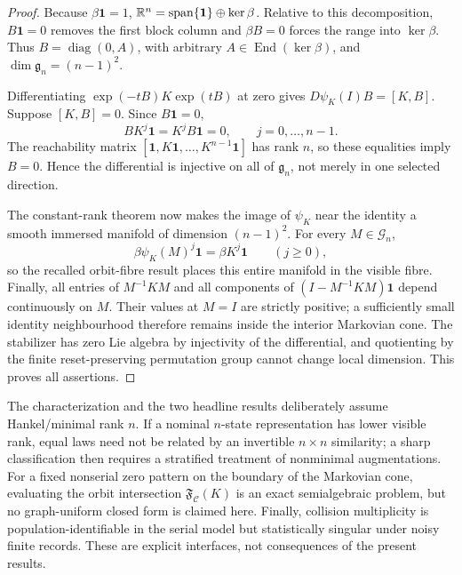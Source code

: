 \begin{proof}
Because \(\beta\mathbf1=1\),
\(\mathbb{R}^n=\operatorname{span}\{\mathbf1\}\oplus\ker\beta\).  Relative to this
decomposition, \(B\mathbf1=0\) removes the first block column and
\(\beta B=0\) forces the range into \(\ker\beta\).  Thus
\(B=\operatorname{diag}(0,A)\), with arbitrary
\(A\in\operatorname{End}(\ker\beta)\), and
\(\dim\mathfrak g_n=(n-1)^2\).

Differentiating \(\exp(-tB)K\exp(tB)\) at zero gives
\(D\psi_K(I)B=[K,B]\).  Suppose \([K,B]=0\).  Since \(B\mathbf1=0\),
\[
BK^j\mathbf1=K^jB\mathbf1=0,
\qquad j=0,\ldots,n-1.
\]
The reachability matrix
\([\mathbf1,K\mathbf1,\ldots,K^{n-1}\mathbf1]\) has rank \(n\), so these
equalities imply \(B=0\).  Hence the differential is injective on all of
\(\mathfrak g_n\), not merely in one selected direction.

The constant-rank theorem now makes the image of \(\psi_K\) near the identity
a smooth immersed manifold of dimension \((n-1)^2\).  For every
\(M\in\mathcal G_n\),
\[
\beta\psi_K(M)^j\mathbf1=\beta K^j\mathbf1\qquad(j\ge0),
\]
so the recalled orbit-fibre result places this entire manifold in the visible
fibre.  Finally, all entries of \(M^{-1}KM\) and all components of
\((I-M^{-1}KM)\mathbf1\) depend continuously on \(M\).  Their values at
\(M=I\) are strictly positive; a sufficiently small identity neighbourhood
therefore remains inside the interior Markovian cone.  The stabilizer has zero
Lie algebra by injectivity of the differential, and quotienting by the finite
reset-preserving permutation group cannot change local dimension.  This proves
all assertions.
\end{proof}

\begin{remark}
\label{rem:nstate-identifiability-open-interfaces-main}
The characterization and the two headline results deliberately assume
Hankel/minimal rank \(n\). If a nominal
\(n\)-state representation has lower visible rank, equal laws need not be
related by an invertible \(n\times n\) similarity; a sharp classification then
requires a stratified treatment of nonminimal augmentations. For a fixed
nonserial zero pattern on the boundary of the Markovian cone, evaluating the
orbit intersection \(\mathfrak F_{\mathcal C}(K)\) is an exact semialgebraic
problem, but no graph-uniform closed form is claimed here. Finally, collision
multiplicity is population-identifiable in the serial model but statistically
singular under noisy finite records. These are explicit interfaces, not
consequences of the present results.
\end{remark}

